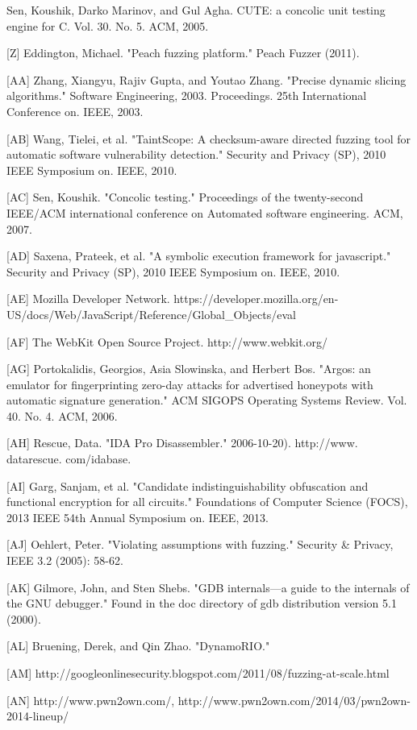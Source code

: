 \documentclass[11pt,expanded,copyright]{fsuthesis}
\begin{document}
\begin{references}
	[Y] Sen, Koushik, Darko Marinov, and Gul Agha. CUTE: a concolic unit testing engine for C. Vol. 30. No. 5. ACM, 2005.

	[Z] Eddington, Michael. "Peach fuzzing platform." Peach Fuzzer (2011).

	[AA] Zhang, Xiangyu, Rajiv Gupta, and Youtao Zhang. "Precise dynamic slicing algorithms." Software Engineering, 2003. Proceedings. 25th International Conference on. IEEE, 2003.

	[AB] Wang, Tielei, et al. "TaintScope: A checksum-aware directed fuzzing tool for automatic software vulnerability detection." Security and Privacy (SP), 2010 IEEE Symposium on. IEEE, 2010.

	[AC] Sen, Koushik. "Concolic testing." Proceedings of the twenty-second IEEE/ACM international conference on Automated software engineering. ACM, 2007.

	[AD] Saxena, Prateek, et al. "A symbolic execution framework for javascript." Security and Privacy (SP), 2010 IEEE Symposium on. IEEE, 2010.

	[AE] Mozilla Developer Network. https://developer.mozilla.org/en-US/docs/Web/JavaScript/Reference/Global\_Objects/eval

	[AF] The WebKit Open Source Project. http://www.webkit.org/

	[AG] Portokalidis, Georgios, Asia Slowinska, and Herbert Bos. "Argos: an emulator for fingerprinting zero-day attacks for advertised honeypots with automatic signature generation." ACM SIGOPS Operating Systems Review. Vol. 40. No. 4. ACM, 2006.

	[AH] Rescue, Data. "IDA Pro Disassembler." 2006-10-20). http://www. datarescue. com/idabase.

	[AI] Garg, Sanjam, et al. "Candidate indistinguishability obfuscation and functional encryption for all circuits." Foundations of Computer Science (FOCS), 2013 IEEE 54th Annual Symposium on. IEEE, 2013.

	[AJ] Oehlert, Peter. "Violating assumptions with fuzzing." Security \& Privacy, IEEE 3.2 (2005): 58-62.

	[AK] Gilmore, John, and Sten Shebs. "GDB internals—a guide to the internals of the GNU debugger." Found in the doc directory of gdb distribution version 5.1 (2000).

	[AL] Bruening, Derek, and Qin Zhao. "DynamoRIO."	

	[AM] http://googleonlinesecurity.blogspot.com/2011/08/fuzzing-at-scale.html

	[AN] http://www.pwn2own.com/, http://www.pwn2own.com/2014/03/pwn2own-2014-lineup/


\end{references}
\end{document}
